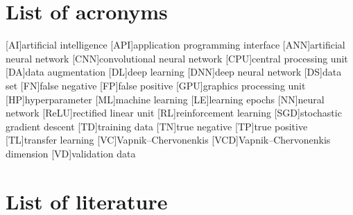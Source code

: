 \documentclass[10pt]{article}
\begin{document}
		

	\clearpage
	\section*{List of acronyms}
		\begin{acronym}[General]
			\setlength{\itemsep}{0em}
			[AI]{artificial intelligence}
			[API]{application programming interface}
			[ANN]{artificial neural network}
			[CNN]{convolutional neural network}
			[CPU]{central processing unit}
			[DA]{data augmentation}
			[DL]{deep learning}
			[DNN]{deep neural network}
			[DS]{data set}
			[FN]{false negative}
			[FP]{false positive}
			[GPU]{graphics processing unit}
			[HP]{hyperparameter}
			[ML]{machine learning}
			[LE]{learning epochs}
			[NN]{neural network}
			[ReLU]{rectified linear unit}
			[RL]{reinforcement learning}
			[SGD]{stochastic gradient descent}
			[TD]{training data}
			[TN]{true negative}
			[TP]{true positive}
			[TL]{transfer learning}
			[VC]{Vapnik–Chervonenkis}
			[VCD]{Vapnik–Chervonenkis dimension}
			[VD]{validation data}
		\end{acronym}
		
		
		
	\pagebreak	
	\section*{List of literature}
		\printbibliography[heading=none]
	
\end{document}
